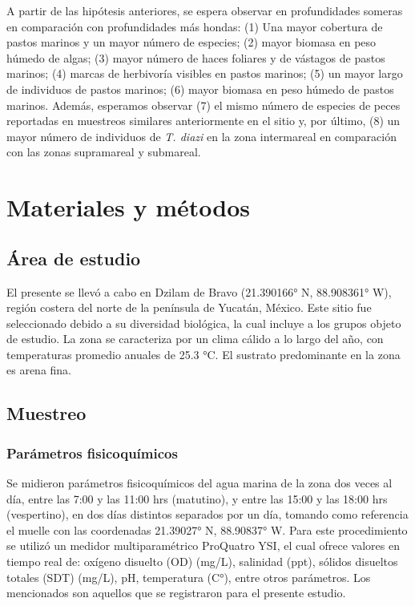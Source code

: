 \documentclass[
  authoryear,
  preprint,
  3p,
  twocolumn]{elsarticle}
\begin{document}
A partir de las hipótesis anteriores, se espera observar en
profundidades someras en comparación con profundidades más hondas: (1)
Una mayor cobertura de pastos marinos y un mayor número de especies; (2)
mayor biomasa en peso húmedo de algas; (3) mayor número de haces
foliares y de vástagos de pastos marinos; (4) marcas de herbivoría
visibles en pastos marinos; (5) un mayor largo de individuos de pastos
marinos; (6) mayor biomasa en peso húmedo de pastos marinos. Además,
esperamos observar (7) el mismo número de especies de peces reportadas
en muestreos similares anteriormente en el sitio y, por último, (8) un
mayor número de individuos de \emph{T. diazi} en la zona intermareal en
comparación con las zonas supramareal y submareal.

\section{Materiales y métodos}\label{materiales-y-muxe9todos}

\subsection{\texorpdfstring{\textbf{Área de
estudio}}{Área de estudio}}\label{uxe1rea-de-estudio}

El presente se llevó a cabo en Dzilam de Bravo (21.390166° N, 88.908361°
W), región costera del norte de la península de Yucatán, México. Este
sitio fue seleccionado debido a su diversidad biológica, la cual incluye
a los grupos objeto de estudio. La zona se caracteriza por un clima
cálido a lo largo del año, con temperaturas promedio anuales de 25.3 °C.
El sustrato predominante en la zona es arena fina.

\subsection{\texorpdfstring{\textbf{Muestreo}}{Muestreo}}\label{muestreo}

\subsubsection{Parámetros
fisicoquímicos}\label{paruxe1metros-fisicoquuxedmicos}

Se midieron parámetros fisicoquímicos del agua marina de la zona dos
veces al día, entre las 7:00 y las 11:00 hrs (matutino), y entre las
15:00 y las 18:00 hrs (vespertino), en dos días distintos separados por
un día, tomando como referencia el muelle con las coordenadas 21.39027°
N, 88.90837° W. Para este procedimiento se utilizó un medidor
multiparamétrico ProQuatro YSI, el cual ofrece valores en tiempo real
de: oxígeno disuelto (OD) (mg/L), salinidad (ppt), sólidos disueltos
totales (SDT) (mg/L), pH, temperatura (C°), entre otros parámetros. Los
mencionados son aquellos que se registraron para el presente estudio.
\end{document}
